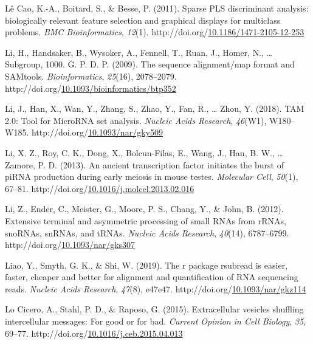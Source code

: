 \documentclass[12pt,twoside]{reedthesis}
\newlength{\cslhangindent}
\newenvironment{CSLReferences}[2] %
 {%
  \setlength{\parindent}{0pt}
  \ifodd #1 \everypar{\setlength{\hangindent}{\cslhangindent}}\ignorespaces\fi
  \ifnum #2 > 0
  \setlength{\parskip}{#2\baselineskip}
  \fi
 }%
 {}
\begin{document}
\begin{CSLReferences}{1}{0}
\leavevmode{}%
Lê Cao, K.-A., Boitard, S., \& Besse, P. (2011). Sparse PLS discriminant analysis: biologically relevant feature selection and graphical displays for multiclass problems. \emph{BMC Bioinformatics}, \emph{12}(1). http://doi.org/\href{https://doi.org/10.1186/1471-2105-12-253}{10.1186/1471-2105-12-253}

\leavevmode{}%
Li, H., Handsaker, B., Wysoker, A., Fennell, T., Ruan, J., Homer, N., \ldots{} Subgroup, 1000. G. P. D. P. (2009). The sequence alignment/map format and SAMtools. \emph{Bioinformatics}, \emph{25}(16), 2078--2079. http://doi.org/\href{https://doi.org/10.1093/bioinformatics/btp352}{10.1093/bioinformatics/btp352}

\leavevmode{}%
Li, J., Han, X., Wan, Y., Zhang, S., Zhao, Y., Fan, R., \ldots{} Zhou, Y. (2018). TAM 2.0: Tool for MicroRNA set analysis. \emph{Nucleic Acids Research}, \emph{46}(W1), W180--W185. http://doi.org/\href{https://doi.org/10.1093/nar/gky509}{10.1093/nar/gky509}

\leavevmode{}%
Li, X. Z., Roy, C. K., Dong, X., Bolcun-Filas, E., Wang, J., Han, B. W., \ldots{} Zamore, P. D. (2013). An ancient transcription factor initiates the burst of piRNA production during early meiosis in mouse testes. \emph{Molecular Cell}, \emph{50}(1), 67--81. http://doi.org/\href{https://doi.org/10.1016/j.molcel.2013.02.016}{10.1016/j.molcel.2013.02.016}

\leavevmode{}%
Li, Z., Ender, C., Meister, G., Moore, P. S., Chang, Y., \& John, B. (2012). Extensive terminal and asymmetric processing of small RNAs from rRNAs, snoRNAs, snRNAs, and tRNAs. \emph{Nucleic Acids Research}, \emph{40}(14), 6787--6799. http://doi.org/\href{https://doi.org/10.1093/nar/gks307}{10.1093/nar/gks307}

\leavevmode{}%
Liao, Y., Smyth, G. K., \& Shi, W. (2019). The r package rsubread is easier, faster, cheaper and better for alignment and quantification of RNA sequencing reads. \emph{Nucleic Acids Research}, \emph{47}(8), e47e47. http://doi.org/\href{https://doi.org/10.1093/nar/gkz114}{10.1093/nar/gkz114}

\leavevmode{}%
Lo Cicero, A., Stahl, P. D., \& Raposo, G. (2015). Extracellular vesicles shuffling intercellular messages: For good or for bad. \emph{Current Opinion in Cell Biology}, \emph{35}, 69--77. http://doi.org/\href{https://doi.org/10.1016/j.ceb.2015.04.013}{10.1016/j.ceb.2015.04.013}


\end{CSLReferences}
\end{document}
